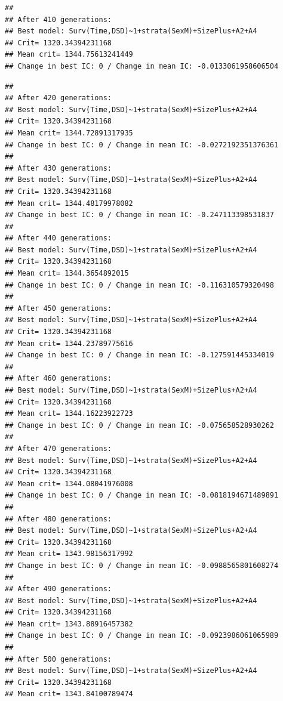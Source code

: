 \documentclass{article}\usepackage[]{graphicx}\usepackage[]{color}
\makeatletter
\newenvironment{kframe}{%
 \def\at@end@of@kframe{}%
 \ifinner\ifhmode%
  \def\at@end@of@kframe{\end{minipage}}%
  \begin{minipage}{\columnwidth}%
 \fi\fi%
 \def\FrameCommand##1{\hskip\@totalleftmargin \hskip-\fboxsep
 \colorbox{shadecolor}{##1}\hskip-\fboxsep
     \hskip-\linewidth \hskip-\@totalleftmargin \hskip\columnwidth}%
 \MakeFramed {\advance\hsize-\width
   \@totalleftmargin\z@ \linewidth\hsize
   \@setminipage}}%
 {\par\unskip\endMakeFramed%
 \at@end@of@kframe}
\newenvironment{knitrout}{}{} %
\makeatother
\begin{document}
\begin{knitrout}
\begin{kframe}
{\ttfamily\noindent\color{warningcolor}{\#\# Warning in fitter(X, Y, strats, offset, init, control, weights = weights, : Loglik converged before variable\ \ 11 ; beta may be infinite.}}\begin{verbatim}
## 
## After 410 generations:
## Best model: Surv(Time,DSD)~1+strata(SexM)+SizePlus+A2+A4
## Crit= 1320.34394231168
## Mean crit= 1344.75613241449
## Change in best IC: 0 / Change in mean IC: -0.0133061958606504
\end{verbatim}


{\ttfamily\noindent\color{warningcolor}{\#\# Warning in fitter(X, Y, strats, offset, init, control, weights = weights, : Loglik converged before variable\ \ 6 ; beta may be infinite.}}\begin{verbatim}
## 
## After 420 generations:
## Best model: Surv(Time,DSD)~1+strata(SexM)+SizePlus+A2+A4
## Crit= 1320.34394231168
## Mean crit= 1344.72891317935
## Change in best IC: 0 / Change in mean IC: -0.0272192351376361
## 
## After 430 generations:
## Best model: Surv(Time,DSD)~1+strata(SexM)+SizePlus+A2+A4
## Crit= 1320.34394231168
## Mean crit= 1344.48179978082
## Change in best IC: 0 / Change in mean IC: -0.247113398531837
## 
## After 440 generations:
## Best model: Surv(Time,DSD)~1+strata(SexM)+SizePlus+A2+A4
## Crit= 1320.34394231168
## Mean crit= 1344.3654892015
## Change in best IC: 0 / Change in mean IC: -0.116310579320498
## 
## After 450 generations:
## Best model: Surv(Time,DSD)~1+strata(SexM)+SizePlus+A2+A4
## Crit= 1320.34394231168
## Mean crit= 1344.23789775616
## Change in best IC: 0 / Change in mean IC: -0.127591445334019
## 
## After 460 generations:
## Best model: Surv(Time,DSD)~1+strata(SexM)+SizePlus+A2+A4
## Crit= 1320.34394231168
## Mean crit= 1344.16223922723
## Change in best IC: 0 / Change in mean IC: -0.075658528930262
## 
## After 470 generations:
## Best model: Surv(Time,DSD)~1+strata(SexM)+SizePlus+A2+A4
## Crit= 1320.34394231168
## Mean crit= 1344.08041976008
## Change in best IC: 0 / Change in mean IC: -0.0818194671489891
## 
## After 480 generations:
## Best model: Surv(Time,DSD)~1+strata(SexM)+SizePlus+A2+A4
## Crit= 1320.34394231168
## Mean crit= 1343.98156317992
## Change in best IC: 0 / Change in mean IC: -0.0988565801608274
## 
## After 490 generations:
## Best model: Surv(Time,DSD)~1+strata(SexM)+SizePlus+A2+A4
## Crit= 1320.34394231168
## Mean crit= 1343.88916457382
## Change in best IC: 0 / Change in mean IC: -0.0923986061065989
## 
## After 500 generations:
## Best model: Surv(Time,DSD)~1+strata(SexM)+SizePlus+A2+A4
## Crit= 1320.34394231168
## Mean crit= 1343.84100789474

\end{verbatim}
\end{kframe}
\end{knitrout}
\end{document}
